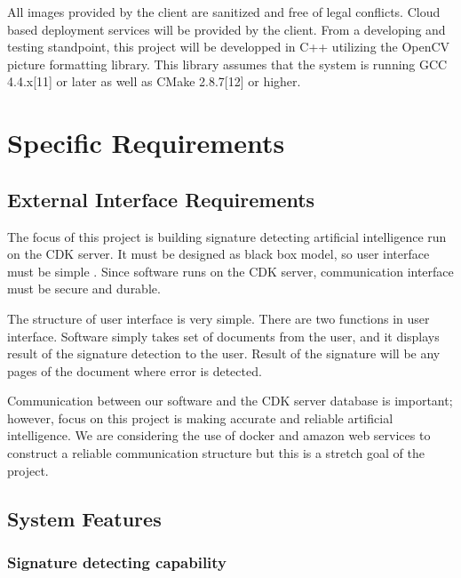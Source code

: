 \documentclass[onecolumn, draftclsnofoot,10pt, compsoc]{IEEEtran}
\begin{document}
All images provided by the client are sanitized and free of legal conflicts. Cloud based deployment services will be provided by the client. From a developing and testing standpoint, this project will be developped in C++ utilizing the OpenCV picture formatting library. This library assumes that the system is running GCC 4.4.x[11] or later as well as CMake 2.8.7[12] or higher. 



\section{Specific Requirements}

\subsection{External Interface Requirements}
The focus of this project is building signature detecting artificial intelligence run on the CDK server. It must be designed as black box model, so user interface must be simple . Since software runs on the CDK server, communication interface must be secure and durable. 

The structure of user interface is very simple. There are two functions in user interface. Software simply takes set of documents from the user, and it displays result of the signature detection to the user. Result of the signature will be any pages of the document where error is detected.

Communication between our software and the CDK server database is important; however, focus on this project is making accurate and reliable artificial intelligence. We are considering the use of docker and amazon web services to construct a reliable communication structure but this is a stretch goal of the project.

\subsection{System Features}
\subsubsection{Signature detecting capability}\vspace{.5cm}
\end{document}
